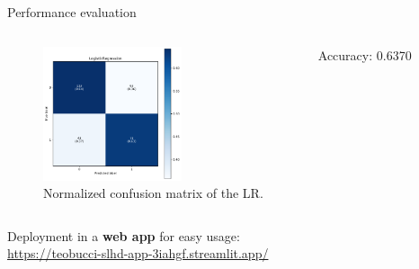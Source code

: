 \documentclass[aspectratio=169,xcolor=dvipsnames]{beamer}
\begin{document}
\begin{frame}{Performance evaluation}

    \begin{columns}[c]

        \begin{figure}[htpb]
            \centering
            \includegraphics[width=1.6in]{confusion_matrix_LR.pdf}
            \caption{Normalized confusion matrix of the LR.}
            \label{fig:confusion}
        \end{figure}

        \centering
        \begin{table}
            \caption{Classification report.}
        \end{table}
        Accuracy: 0.6370
        
    \end{columns}

    \vspace{0.5cm}
    Deployment in a \textbf{web app} for easy usage:\\
    \url{https://teobucci-slhd-app-3iahgf.streamlit.app/}

\end{frame}
\end{document}
